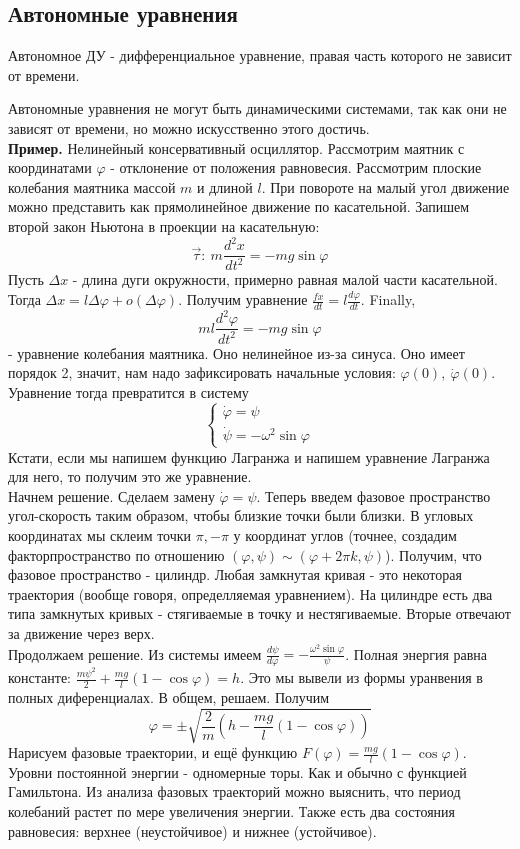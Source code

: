 \subsection{Автономные уравнения}
\begin{defin}
Автономное ДУ - дифференциальное уравнение, правая часть которого не зависит
от времени.
\end{defin}
Автономные уравнения не могут быть динамическими системами, так как они 
не зависят от времени, но можно искусственно этого достичь.\\
\textbf{Пример.} Нелинейный консервативный
осциллятор. Рассмотрим маятник с координатами
$\varphi$ - отклонение от положения равновесия. Рассмотрим плоские
колебания маятника массой $m$ и длиной $l$. При повороте на малый угол 
движение можно представить как прямолинейное движение по касательной.
Запишем второй закон Ньютона в проекции на касательную: 
$$\vec\tau:~m\frac{d^2x}{dt^2}=-mg\sin\varphi$$ 
Пусть $\Delta x$ - длина дуги окружности, примерно равная малой части 
касательной. Тогда  $\Delta x=l\Delta\varphi+o(\Delta\varphi)$.
Получим уравнение
$\frac{fx}{dt}=l \frac{d\varphi}{dt}$. Finally,
$$ml \frac{d^2\varphi}{dt^2}=-mg\sin\varphi$$ 
- уравнение колебания маятника. Оно нелинейное из-за синуса. 
Оно имеет порядок 2, значит, нам надо
зафиксировать начальные условия: $\varphi(0),~\dot\varphi(0)$.
Уравнение тогда превратится в систему
$$\begin{cases}
    \dot\varphi=\psi\\
    \dot\psi=-\omega^2\sin\varphi
\end{cases}$$
Кстати, если мы напишем функцию Лагранжа и напишем уравнение Лагранжа для
него, то получим это же уравнение.\\
Начнем решение. Сделаем замену $\dot\varphi=\psi$. Теперь введем фазовое 
пространство угол-скорость таким образом, чтобы близкие точки были близки.
В угловых координатах мы склеим точки $\pi,-\pi$ у координат углов (точнее,
создадим факторпространство по отношению $(\varphi,\psi)\sim(\varphi+2\pi k,
\psi)$). Получим, что фазовое пространство - цилиндр. Любая замкнутая кривая 
- это некоторая траектория (вообще говоря, определляемая уравнением).
На цилиндре есть два типа замкнутых кривых - стягиваемые в точку и 
нестягиваемые. Вторые отвечают за движение через верх. \\
Продолжаем решение. Из системы имеем 
$\frac{d\psi}{d\varphi}=-\frac{\omega^2\sin\varphi}{\psi}$.
Полная энергия равна константе:
$\frac{m\psi^2}{2}+\frac{mg}{l}(1-\cos\varphi)=h$.
Это мы вывели из формы уранвения в полных диференциалах. 
В общем, решаем. Получим
$$\varphi=\pm\sqrt{\frac{2}{m}\left( h-\frac{mg}{l}(1-\cos\varphi) \right) }$$ 
Нарисуем фазовые траектории, и ещё функцию 
$F(\varphi)=\frac{mg}{l}(1-\cos\varphi)$.
Уровни постоянной энергии - одномерные торы. Как и обычно с функцией
Гамильтона. 
Из анализа фазовых траекторий можно выяснить, что период колебаний растет по
мере увеличения энергии. Также есть два состояния равновесия: верхнее 
(неустойчивое) и нижнее (устойчивое). 









